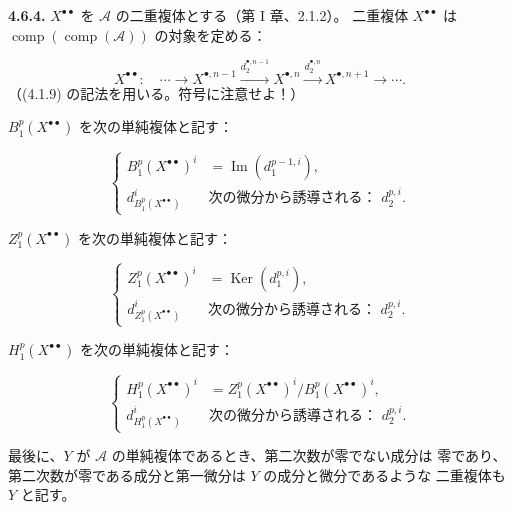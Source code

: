 \clearpage
{}%
\begingroup\small\setlength{\parskip}{0pt}\setlength{\emergencystretch}{1.5em}
\setlength{\abovedisplayskip}{4pt plus 2pt minus 2pt}%
\setlength{\belowdisplayskip}{4pt plus 2pt minus 2pt}%

\noindent\textbf{4.6.4.}\quad
$X^{\bullet\bullet}$ を $\mathcal A$ の二重複体とする（第 I 章、2.1.2）。
二重複体 $X^{\bullet\bullet}$ は
$\operatorname{comp}(\operatorname{comp}(\mathcal A))$ の対象を定める：

\[
X^{\bullet\bullet}\colon\quad
\cdots\longrightarrow X^{\bullet,n-1}
\xrightarrow{d_2^{\bullet,n-1}}X^{\bullet,n}
\xrightarrow{d_2^{\bullet,n}}X^{\bullet,n+1}
\longrightarrow\cdots.
\]
（(4.1.9) の記法を用いる。符号に注意せよ！）

$B_1^p(X^{\bullet\bullet})$ を次の単純複体と記す：

\[
\left\{
\begin{aligned}
B_1^p(X^{\bullet\bullet})^i
  &=\operatorname{Im}(d_1^{p-1,i}),\\
d_{B_1^p(X^{\bullet\bullet})}^{i}
  &\text{次の微分から誘導される： }d_2^{p,i}.
\end{aligned}
\right.
\tag{4.6.4.1}
\]

$Z_1^p(X^{\bullet\bullet})$ を次の単純複体と記す：

\[
\left\{
\begin{aligned}
Z_1^p(X^{\bullet\bullet})^i
  &=\operatorname{Ker}(d_1^{p,i}),\\
d_{Z_1^p(X^{\bullet\bullet})}^{i}
  &\text{次の微分から誘導される： }d_2^{p,i}.
\end{aligned}
\right.
\tag{4.6.4.2}
\]

$H_1^p(X^{\bullet\bullet})$ を次の単純複体と記す：

\[
\left\{
\begin{aligned}
H_1^p(X^{\bullet\bullet})^i
  &=Z_1^p(X^{\bullet\bullet})^i/B_1^p(X^{\bullet\bullet})^i,\\
d_{H_1^p(X^{\bullet\bullet})}^{i}
  &\text{次の微分から誘導される： }d_2^{p,i}.
\end{aligned}
\right.
\tag{4.6.4.3}
\]

最後に、$Y$ が $\mathcal A$ の単純複体であるとき、第二次数が零でない成分は
零であり、第二次数が零である成分と第一微分は $Y$ の成分と微分であるような
二重複体も $Y$ と記す。

